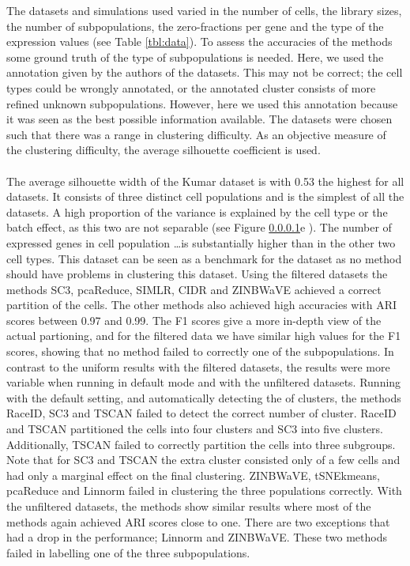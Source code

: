 \documentclass[12pt, a4paper]{article}\usepackage[]{graphicx}\usepackage[]{color}
\begin{document}
The datasets and simulations used varied in the number of cells, the library sizes, the number of subpopulations, the zero-fractions per gene and the type of the expression values (see Table \ref{tbl:data}). To assess the accuracies of the methods some ground truth of the type of subpopulations is needed. Here, we used the annotation given by the authors of the datasets. This may not be correct; the cell types could be wrongly annotated, or the annotated cluster consists of more refined unknown subpopulations. However, here we used this annotation because it was seen as the best possible information available. The datasets were chosen such that there was a range in clustering difficulty. As an objective measure of the clustering difficulty, the average silhouette coefficient is used. 

\paragraph{}
The average silhouette width of the Kumar dataset is with 0.53 the highest for all datasets. It consists of three distinct cell populations and is the simplest of all the datasets.  A high proportion of the variance is explained by the cell type or the batch effect, as this two are not separable (see Figure \ref{}e ). The number of expressed genes in cell population \dots is substantially higher than in the other two cell types. This dataset can be seen as a benchmark for the dataset as no method should have problems in clustering this dataset. Using the filtered datasets the methods SC3, pcaReduce, SIMLR, CIDR and ZINBWaVE achieved a correct partition of the cells. The other methods also achieved high accuracies with ARI scores between 0.97 and 0.99. The F1 scores give a more in-depth view of the actual partioning, and for the filtered data we have similar high values for the F1 scores, showing that no method failed to correctly one of the subpopulations. In contrast to the uniform results with the filtered datasets, the results were more variable when running in default mode and with the unfiltered datasets. Running with the default setting, and automatically detecting the of clusters, the methods RaceID, SC3 and TSCAN failed to detect the correct number of cluster. RaceID and TSCAN partitioned the cells into four clusters and SC3 into five clusters. Additionally, TSCAN failed to correctly partition the cells into three subgroups. Note that for SC3 and TSCAN the extra cluster consisted only of a few cells and had only a marginal effect on the final clustering.
ZINBWaVE, tSNEkmeans, pcaReduce and Linnorm failed in clustering the three populations correctly.
With the unfiltered datasets, the methods show similar results where most of the methods again achieved ARI scores close to one. There are two exceptions that had a drop in the performance; Linnorm and ZINBWaVE. These two methods failed in labelling one of the three subpopulations.
\end{document}
